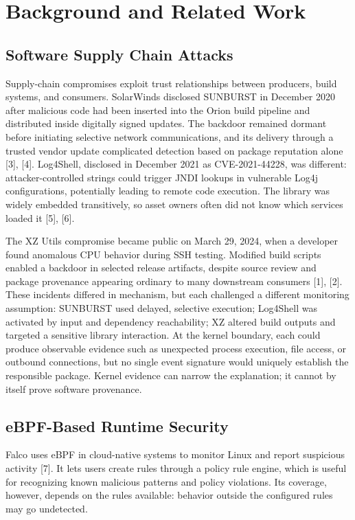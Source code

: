 \documentclass[conference]{IEEEtran}
\begin{document}
\section{Background and Related Work}
\subsection{Software Supply Chain Attacks}
Supply-chain compromises exploit trust relationships between producers, build systems, and consumers. SolarWinds disclosed SUNBURST in December 2020 after malicious code had been inserted into the Orion build pipeline and distributed inside digitally signed updates. The backdoor remained dormant before initiating selective network communications, and its delivery through a trusted vendor update complicated detection based on package reputation alone [3], [4]. Log4Shell, disclosed in December 2021 as CVE-2021-44228, was different: attacker-controlled strings could trigger JNDI lookups in vulnerable Log4j configurations, potentially leading to remote code execution. The library was widely embedded transitively, so asset owners often did not know which services loaded it [5], [6].

The XZ Utils compromise became public on March 29, 2024, when a developer found anomalous CPU behavior during SSH testing. Modified build scripts enabled a backdoor in selected release artifacts, despite source review and package provenance appearing ordinary to many downstream consumers [1], [2]. These incidents differed in mechanism, but each challenged a different monitoring assumption: SUNBURST used delayed, selective execution; Log4Shell was activated by input and dependency reachability; XZ altered build outputs and targeted a sensitive library interaction. At the kernel boundary, each could produce observable evidence such as unexpected process execution, file access, or outbound connections, but no single event signature would uniquely establish the responsible package. Kernel evidence can narrow the explanation; it cannot by itself prove software provenance.

\subsection{eBPF-Based Runtime Security}
Falco uses eBPF in cloud-native systems to monitor Linux and report suspicious activity [7]. It lets users create rules through a policy rule engine, which is useful for recognizing known malicious patterns and policy violations. Its coverage, however, depends on the rules available: behavior outside the configured rules may go undetected.
\end{document}
